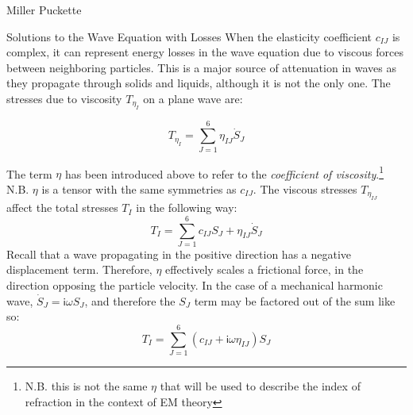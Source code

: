 \documentclass[a4paper,10pt]{report}
\numberwithin{equation}{section}
\begin{document}
\begin{chapter}{Miller Puckette}
\begin{section}{Solutions to the Wave Equation with Losses}
When the elasticity coefficient $c_{IJ}$ is complex, it can represent energy losses in the wave equation due to viscous forces between neighboring particles. This is a major source of attenuation in waves as they propagate through solids and liquids, although it is not the only one. The stresses due to viscosity $T_{\eta_I}$ on a plane wave are\cite[p.~8]{Kino1987}\cite[p.~21]{Ballantine1997}:

\begin{equation}\label{tviscous}
 T_{\eta_{I}} = \sum_{J=1}^6\eta_{IJ} \dot{S}_{J}
\end{equation}

The term $\eta$ has been introduced above to refer to the \emph{coefficient of viscosity}.\footnote{N.B. this is not the same $\eta$ that will be used to describe the index of refraction in the context of EM theory} N.B. $\eta$ is a tensor with the same symmetries as $c_{IJ}$. The viscous stresses $T_{\eta_{IJ}}$ affect the total stresses $T_I$ in the following way:
\begin{equation}\label{ttotal}
 T_I = \sum_{J=1}^6 c_{IJ}S_J + \eta_{IJ} \dot{S}_{J}
\end{equation}
Recall that a wave propagating in the positive direction has a negative displacement term. Therefore, $\eta$ effectively scales a frictional force, in the direction opposing the particle velocity. In the case of a mechanical harmonic wave, $\dot{S}_{J} = \mathsf{i}\omega S_{J}$, and therefore the $S_{J}$ term may be factored out of the sum like so:
\begin{equation}\label{tcomplex}
 T_I = \sum_{J=1}^6 (c_{IJ} + \mathsf{i}\omega\eta_{IJ})S_J
\end{equation}


\end{section}
\end{chapter}
\end{document}
